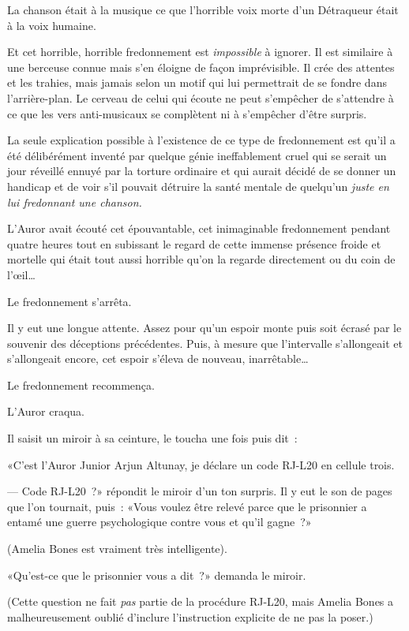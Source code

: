 La chanson était à la musique ce que l'horrible voix morte d'un Détraqueur était à la voix humaine.

Et cet horrible, horrible fredonnement est \emph{impossible} à ignorer. Il est similaire à une berceuse connue mais s'en éloigne de façon imprévisible. Il crée des attentes et les trahies, mais jamais selon un motif qui lui permettrait de se fondre dans l'arrière-plan. Le cerveau de celui qui écoute ne peut s'empêcher de s'attendre à ce que les vers anti-musicaux se complètent ni à s'empêcher d'être surpris.

La seule explication possible à l'existence de ce type de fredonnement est qu'il a été délibérément inventé par quelque génie ineffablement cruel qui se serait un jour réveillé ennuyé par la torture ordinaire et qui aurait décidé de se donner un handicap et de voir s'il pouvait détruire la santé mentale de quelqu'un \emph{juste en lui fredonnant une chanson.}

L'Auror avait écouté cet épouvantable, cet inimaginable fredonnement pendant quatre heures tout en subissant le regard de cette immense présence froide et mortelle qui était tout aussi horrible qu'on la regarde directement ou du coin de l'œil…

Le fredonnement s'arrêta.

Il y eut une longue attente. Assez pour qu'un espoir monte puis soit écrasé par le souvenir des déceptions précédentes. Puis, à mesure que l'intervalle s'allongeait et s'allongeait encore, cet espoir s'éleva de nouveau, inarrêtable…

Le fredonnement recommença.

L'Auror craqua.

Il saisit un miroir à sa ceinture, le toucha une fois puis dit~:

«C'est l'Auror Junior Arjun Altunay, je déclare un code RJ-L20 en cellule trois.

--- Code RJ-L20~?» répondit le miroir d'un ton surpris. Il y eut le son de pages que l'on tournait, puis~: «Vous voulez être relevé parce que le prisonnier a entamé une guerre psychologique contre vous et qu'il gagne~?»

(Amelia Bones est vraiment très intelligente).

«Qu'est-ce que le prisonnier vous a dit~?» demanda le miroir.

(Cette question ne fait \emph{pas} partie de la procédure RJ-L20, mais Amelia Bones a malheureusement oublié d'inclure l'instruction explicite de ne pas la poser.)

